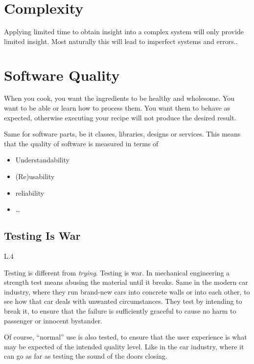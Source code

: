\documentclass[\docroot/main]{subfiles}
\begin{document}
\section{Complexity}
Applying limited time to obtain insight into a complex system will only provide limited insight.
Most naturally this will lead to imperfect systems and errors.\cite{vig2006}.

\section{Software Quality}
When you cook, you want the ingredients to be healthy and wholesome.
You want to be able or learn how to process them. You want them to
behave as expected, otherwise executing your recipe will not  produce
the desired result. 

Same for software parts, be it classes, libraries, designs or services.
This means that the quality of software is measured in terms of
\begin{itemize}
\item Understandability
\item (Re)usability
\item reliability
\item \ldots
\end{itemize}

\subsection{Testing Is War}
\begin{wrapfigure}{L}{.4\textwidth}
\end{wrapfigure}
Testing is different from \textit{trying}. Testing is war. In mechanical
engineering a strength test means abusing the material until it breaks. Same in the
modern car industry, where they run brand-new cars into concrete walls
or into each other, to see how that car deals with unwanted circumstances.
They test by intending to break it, to ensure that the failure is
sufficiently graceful to cause no harm to passenger or innocent bystander.


Of course, ``normal'' use is also tested, to ensure that the user
experience is what may be expected of the intended quality level. Like in the car industry, where it can go as far as testing the sound of the doors closing.
\end{document}

